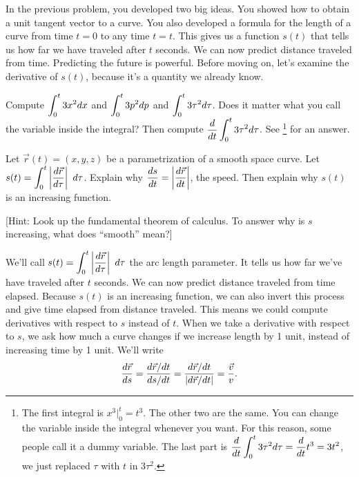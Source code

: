 In the previous problem, you developed two big ideas.  You showed how to obtain a unit tangent vector to a curve. You also developed a formula for the length of a curve from time $t=0$ to any time $t=t$.  This gives us a function $s(t)$ that tells us how far we have traveled after $t$ seconds. We can now predict distance traveled from time. Predicting the future is powerful. Before moving on, let's examine the derivative of $s(t)$, because it's a quantity we already know.

\begin{review*}
 Compute $\displaystyle \int_0^t 3x^2 dx$ and $\displaystyle \int_0^t 3p^2 dp$ and $\displaystyle \int_0^t 3\tau^2 d\tau$. 
 Does it matter what you call the variable inside the integral? 
 Then compute $\displaystyle\frac{d}{dt} \int_0^t 3\tau^2 d\tau$. See 
\footnote{
The first integral is $x^3|_0^t = t^3$. The other two are the same. You can change the variable inside the integral whenever you want.  For this reason, some people call it a dummy variable. 
The last part is $\displaystyle\frac{d}{dt} \int_0^t 3\tau^2 d\tau = \frac{d}{dt} t^3 = 3t^2$, 
we just replaced $\tau$ with $t$ in $3\tau^2$.}
for an answer. 
\end{review*}


\begin{problem}\label{fundamental theorem of calculus as it applies to arc length parameter}
%
 Let $\vec r(t)=(x,y,z)$ be a parametrization of a smooth space curve. Let $\displaystyle s(t)=\int_0^t \left|\frac {d\vec r}{d\tau} \right|\ d\tau$.  Explain why $\displaystyle\frac{ds}{dt} = \left|\frac {d\vec r}{dt} \right|$, the speed. Then explain why $s(t)$ is an increasing function.

 [Hint: Look up the fundamental theorem of calculus. To answer why is $s$ increasing, what does ``smooth'' mean?] 
\end{problem}

We'll call $\displaystyle s(t)=\int_0^t \left|\frac {d\vec r}{d\tau}\right|\ d\tau$ the arc length parameter.  It tells us how far we've have traveled after $t$ seconds. We can now predict distance traveled from time elapsed. Because $s(t)$ is an increasing function, we can also invert this process and give time elapsed from distance traveled. This means we could compute derivatives with respect to $s$ instead of $t$.  
When we take a derivative with respect to $s$, we ask how much a curve changes if we increase length by 1 unit, instead of increasing time by 1 unit.  We'll write
$$\displaystyle\frac{d\vec r}{ds} =\displaystyle\frac{d\vec r/dt}{ds/dt} = \frac{d\vec r/dt}{|d\vec r/dt|} = \frac{\vec v}{v}.$$

